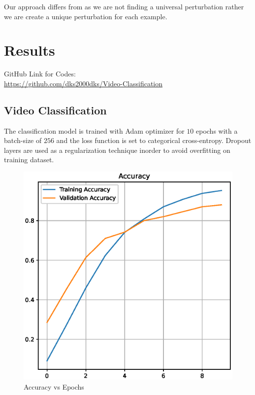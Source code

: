 \documentclass[10pt,twocolumn,letterpaper]{article}
\begin{document}
Our approach differs from \cite{wei2018sparse} as we are not finding a universal perturbation rather we are create a unique perturbation for each example.

\section{Results}
GitHub Link for Codes:\\
\href{https://github.com/dks2000dks/Video-Classification}{https://github.com/dks2000dks/Video-Classification}
\subsection{Video Classification}
The classification model is trained with Adam optimizer for $10$ epochs with a batch-size of $256$ and the loss function is set to categorical cross-entropy. Dropout layers are used as a regularization technique inorder to avoid overfitting on training dataset.
\begin{figure}[!ht]
    \centering
    \includegraphics[width=\columnwidth]{./Images/Accuracy.eps}
    \caption{Accuracy vs Epochs}
\end{figure}
\end{document}
